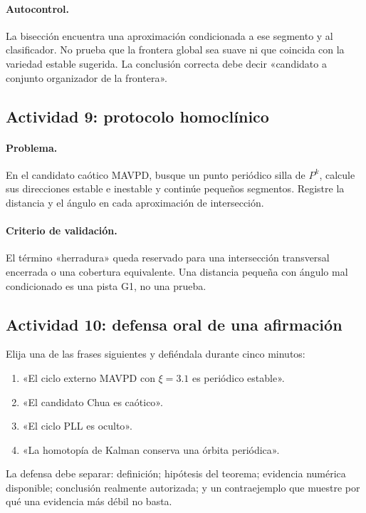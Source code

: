\paragraph{Autocontrol.}
La bisección encuentra una aproximación condicionada a ese segmento y al
clasificador. No prueba que la frontera global sea suave ni que coincida con
la variedad estable sugerida. La conclusión correcta debe decir «candidato a
conjunto organizador de la frontera».

\subsection{Actividad 9: protocolo homoclínico}

\paragraph{Problema.}
En el candidato caótico MAVPD, busque un punto periódico silla de \(P^k\),
calcule sus direcciones estable e inestable y continúe pequeños segmentos.
Registre la distancia y el ángulo en cada aproximación de intersección.

\paragraph{Criterio de validación.}
El término «herradura» queda reservado para una intersección transversal
encerrada o una cobertura equivalente. Una distancia pequeña con ángulo mal
condicionado es una pista G1, no una prueba.

\subsection{Actividad 10: defensa oral de una afirmación}

Elija una de las frases siguientes y defiéndala durante cinco minutos:

\begin{enumerate}
  \item «El ciclo externo MAVPD con \(\xi=3.1\) es periódico estable».
  \item «El candidato Chua es caótico».
  \item «El ciclo PLL es oculto».
  \item «La homotopía de Kalman conserva una órbita periódica».
\end{enumerate}

La defensa debe separar: definición; hipótesis del teorema; evidencia numérica
disponible; conclusión realmente autorizada; y un contraejemplo que muestre por
qué una evidencia más débil no basta.

